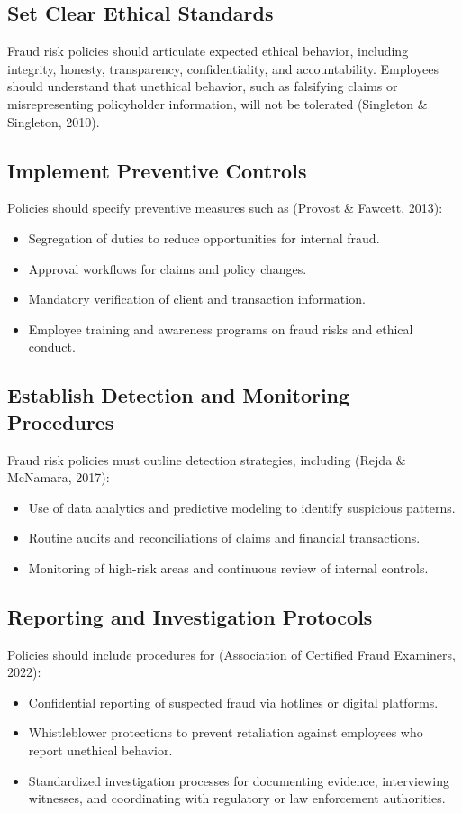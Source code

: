 \documentclass[12pt,a4paper]{article}
\begin{document}
\subsection{Set Clear Ethical Standards}
Fraud risk policies should articulate expected ethical behavior, including integrity, honesty, transparency, confidentiality, and accountability. Employees should understand that unethical behavior, such as falsifying claims or misrepresenting policyholder information, will not be tolerated (Singleton \& Singleton, 2010).

\subsection{Implement Preventive Controls}
Policies should specify preventive measures such as (Provost \& Fawcett, 2013):
\begin{itemize}
    \item Segregation of duties to reduce opportunities for internal fraud.
    \item Approval workflows for claims and policy changes.
    \item Mandatory verification of client and transaction information.
    \item Employee training and awareness programs on fraud risks and ethical conduct.
\end{itemize}

\subsection{Establish Detection and Monitoring Procedures}
Fraud risk policies must outline detection strategies, including (Rejda \& McNamara, 2017):
\begin{itemize}
    \item Use of data analytics and predictive modeling to identify suspicious patterns.
    \item Routine audits and reconciliations of claims and financial transactions.
    \item Monitoring of high-risk areas and continuous review of internal controls.
\end{itemize}

\subsection{Reporting and Investigation Protocols}
Policies should include procedures for (Association of Certified Fraud Examiners, 2022):
\begin{itemize}
    \item Confidential reporting of suspected fraud via hotlines or digital platforms.
    \item Whistleblower protections to prevent retaliation against employees who report unethical behavior.
    \item Standardized investigation processes for documenting evidence, interviewing witnesses, and coordinating with regulatory or law enforcement authorities.
\end{itemize}
\end{document}
